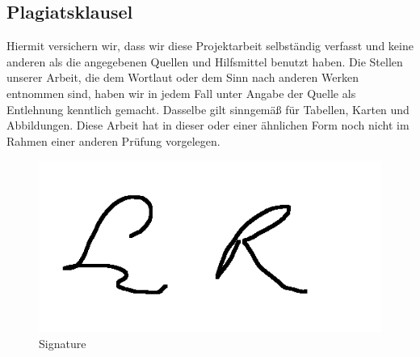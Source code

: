 \subsection*{Plagiatsklausel}

Hiermit versichern wir, dass wir diese Projektarbeit selbständig verfasst und keine
anderen als die angegebenen Quellen und Hilfsmittel benutzt haben. Die Stellen
unserer Arbeit, die dem Wortlaut oder dem Sinn nach anderen Werken entnommen
sind, haben wir in jedem Fall unter Angabe der Quelle als Entlehnung kenntlich
gemacht. Dasselbe gilt sinngemäß für Tabellen, Karten und Abbildungen. Diese Arbeit
hat in dieser oder einer ähnlichen Form noch nicht im Rahmen einer anderen Prüfung
vorgelegen.

\begin{figure}[hbtp]
	\centering
	\includegraphics[width=.5\linewidth, page=1]{reference/signature/l_sign.png}
	\caption{Signature}
\end{figure}
